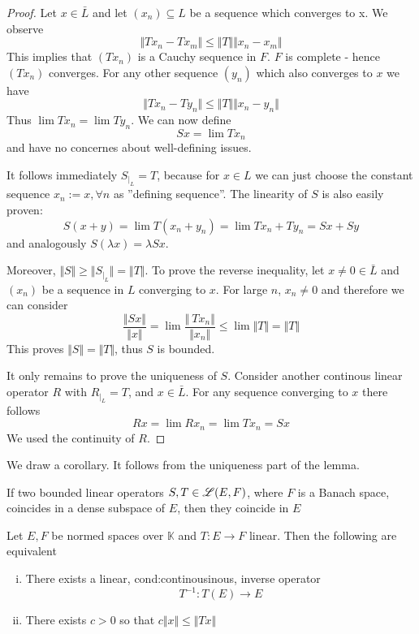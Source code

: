 \begin{proof}
	Let $x \in \bar{L}$ and let $(x_n) \subseteq L$ be a sequence which converges to x. We observe
	\[
      \Vert Tx_n - Tx_m \Vert \leq \Vert T \Vert \Vert x_n - x_m \Vert
     \] 
	This implies that $(Tx_n)$ is a Cauchy sequence in $F$. $F$ is complete - hence $(Tx_n)$ converges.
	For any other sequence $(y_n)$ which also converges to $x$ we have
	\[
		\Vert Tx_n - Ty_n \Vert \leq \Vert T \Vert \Vert x_n - y_n \Vert
	\]
	Thus $\lim Tx_n = \lim Ty_n$. We can now define
    \[
		Sx = \lim Tx_n
	\]
	and have no concernes about well-defining issues. 

	It follows immediately $S_{\vert_L}=T$, because for $x \in L$ we can just choose the constant sequence $x_n:=x , \forall n$ as 	''defining sequence''. The linearity of $S$ is also easily proven:
	\[
		S(x+y) = \lim T(x_n+y_n) = \lim Tx_n + Ty_n =Sx +Sy
	\]
	and analogously $S(\lambda x) = \lambda Sx$.

	Moreover, $\Vert S \Vert \geq \Vert S_{\vert_L} \Vert = \Vert T \Vert$. To prove the reverse inequality, let $x \neq 0 \in 			\bar{L}$ and $(x_n)$ be a sequence in $L$ converging to $x$. For large $n$, $x_n \neq 0$ and therefore we can consider
	\[
		\frac{\Vert Sx \Vert}{\Vert x \Vert} = \lim \frac{\Vert\ T x_n\Vert }{\Vert x_n \Vert } 
												\leq \lim \Vert T \Vert = \Vert T \Vert
	\]
	This proves $\Vert S \Vert = \Vert T \Vert$, thus $S$ is bounded.

	It only remains to prove the uniqueness of $S$. Consider another continous linear operator $R$ with 
	$R_{\vert_L}=T$, and $x \in \bar{L}$. 
	For any sequence converging to $x$ there follows
	\[
		Rx= \lim Rx_n = \lim Tx_n =Sx
	\]
	We used the continuity of $R$.
\end{proof}

We draw a corollary. It follows from the uniqueness part of the lemma.

\begin{kor} \label{cor_lift_from_dense}
	If two bounded linear operators $S,T \in \mathscr L(E,F)$, where $F$ is a Banach space, 
	coincides in a dense subspace of $E$, then they coincide in $E$
\end{kor}

\begin{lemma} \label{inverse}
	Let $E,F$ be normed spaces over $\mathbb{K}$ and $T: E \to F$ linear. Then the following are equivalent
	\begin{enumerate}[(i)]
		 \item There exists a linear, cond:continousinous, inverse operator \label{invertible}
 			\[
  				T^{-1}: T(E) \to E
 			\]
 		\item  There exists $c >0$ so that $c \Vert x \Vert \leq \Vert Tx\Vert$ \label{inv_bound}
	\end{enumerate}
\end{lemma}

